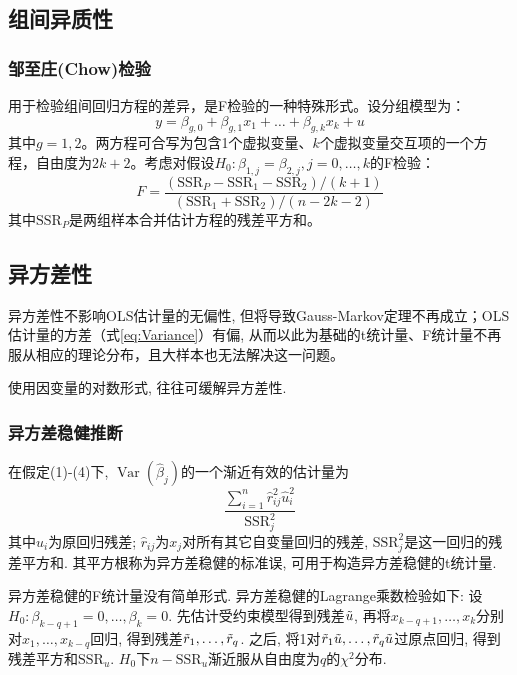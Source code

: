 \subsection{组间异质性}

\subsubsection{邹至庄(Chow)检验}
\par 用于检验组间回归方程的差异，是F检验的一种特殊形式。设分组模型为：
\begin{equation}
y=\beta_{g,0}+\beta_{g,1}x_1+\dots+\beta_{g,k}x_k+u
\end{equation}
其中$g=1,2$。两方程可合写为包含1个虚拟变量、$k$个虚拟变量交互项的一个方程，自由度为$2k+2$。考虑对假设$H_0: \beta_{1,j}=\beta_{2,j},j=0,\dots,k$的F检验：
\begin{equation}
    F=\frac{(\text{SSR}_P-\text{SSR}_1-\text{SSR}_2)/(k+1)}{(\text{SSR}_1+\text{SSR}_2)/(n-2k-2)}
\end{equation}
其中$\text{SSR}_P$是两组样本合并估计方程的残差平方和。

\subsection{异方差性}

\par 异方差性不影响OLS估计量的无偏性, 但将导致Gauss-Markov定理不再成立；OLS估计量的方差（式\ref{eq:Variance}）有偏, 从而以此为基础的t统计量、F统计量不再服从相应的理论分布，且大样本也无法解决这一问题。
\par 使用因变量的对数形式, 往往可缓解异方差性. 

\subsubsection{异方差稳健推断}
\par 在假定(1)-(4)下, $\operatorname{Var}(\hat{\beta}_j)$的一个渐近有效的估计量为
\begin{equation}
    \frac{\sum_{i=1}^n \hat{r}_{ij}^2\hat{u}_i^2}{\text{SSR}_j^2}
\end{equation}
其中$\hat{u}_i$为原回归残差; $\hat{r}_{ij}$为$x_j$对所有其它自变量回归的残差, $\text{SSR}_j^2$是这一回归的残差平方和. 其平方根称为异方差稳健的标准误, 可用于构造异方差稳健的t统计量. 

\par 异方差稳健的F统计量没有简单形式. 异方差稳健的Lagrange乘数检验如下: 设$H_0: \beta_{k-q+1}=0,\dots, \beta_k=0$. 先估计受约束模型得到残差$\Tilde{u}$, 再将$x_{k-q+1}, \dots, x_k$分别对$x_1,\dots, x_{k-q}$回归, 得到残差$\Tilde{r}_1,\dots,\Tilde{r}_q$. 之后, 将1对$\Tilde{r}_1\Tilde{u},\dots,\Tilde{r}_q\Tilde{u}$过原点回归, 得到残差平方和$\mathrm{SSR}_u$. $H_0$下$n-\mathrm{SSR}_u$渐近服从自由度为$q$的$\chi^2$分布. 

